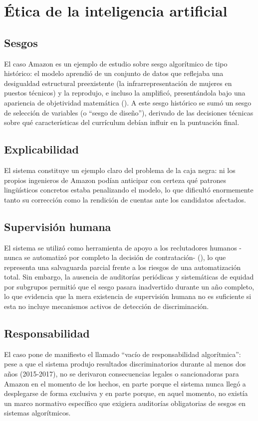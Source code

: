 \section{Ética de la inteligencia artificial}

\subsection{Sesgos}
El caso Amazon es un ejemplo de estudio sobre sesgo algorítmico de tipo histórico: el modelo aprendió de un conjunto de datos que reflejaba una desigualdad estructural preexistente (la infrarrepresentación de mujeres en puestos técnicos) y la reprodujo, e incluso la amplificó, presentándola bajo una apariencia de objetividad matemática (\textcite{raghavan2020,chen2023}). A este sesgo histórico se sumó un sesgo de selección de variables (o ``sesgo de diseño''), derivado de las decisiones técnicas sobre qué características del currículum debían influir en la puntuación final.

\subsection{Explicabilidad}
El sistema constituye un ejemplo claro del problema de la caja negra: ni los propios ingenieros de Amazon podían anticipar con certeza qué patrones lingüísticos concretos estaba penalizando el modelo, lo que dificultó enormemente tanto su corrección como la rendición de cuentas ante los candidatos afectados.

\subsection{Supervisión humana}
El sistema se utilizó como herramienta de apoyo a los reclutadores humanos -nunca se automatizó por completo la decisión de contratación- (\textcite{infobae2018}), lo que representa una salvaguarda parcial frente a los riesgos de una automatización total. Sin embargo, la ausencia de auditorías periódicas y sistemáticas de equidad por subgrupos permitió que el sesgo pasara inadvertido durante un año completo, lo que evidencia que la mera existencia de supervisión humana no es suficiente si esta no incluye mecanismos activos de detección de discriminación.

\subsection{Responsabilidad}
El caso pone de manifiesto el llamado ``vacío de responsabilidad algorítmica'': pese a que el sistema produjo resultados discriminatorios durante al menos dos años (2015-2017), no se derivaron consecuencias legales o sancionadoras para Amazon en el momento de los hechos, en parte porque el sistema nunca llegó a desplegarse de forma exclusiva y en parte porque, en aquel momento, no existía un marco normativo específico que exigiera auditorías obligatorias de sesgos en sistemas algorítmicos.
